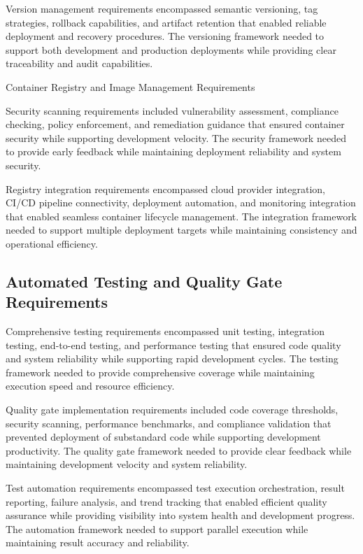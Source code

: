 Version management requirements encompassed semantic versioning, tag strategies, rollback capabilities, and artifact retention that enabled reliable deployment and recovery procedures. The versioning framework needed to support both development and production deployments while providing clear traceability and audit capabilities.

\begin{table}[H]
\centering
\caption{Container Registry and Image Management Requirements}
\label{tab:container-registry-management}
\end{table}

Security scanning requirements included vulnerability assessment, compliance checking, policy enforcement, and remediation guidance that ensured container security while supporting development velocity. The security framework needed to provide early feedback while maintaining deployment reliability and system security.

Registry integration requirements encompassed cloud provider integration, CI/CD pipeline connectivity, deployment automation, and monitoring integration that enabled seamless container lifecycle management. The integration framework needed to support multiple deployment targets while maintaining consistency and operational efficiency.

\subsection{Automated Testing and Quality Gate Requirements}

Comprehensive testing requirements encompassed unit testing, integration testing, end-to-end testing, and performance testing that ensured code quality and system reliability while supporting rapid development cycles. The testing framework needed to provide comprehensive coverage while maintaining execution speed and resource efficiency.

Quality gate implementation requirements included code coverage thresholds, security scanning, performance benchmarks, and compliance validation that prevented deployment of substandard code while supporting development productivity. The quality gate framework needed to provide clear feedback while maintaining development velocity and system reliability.

Test automation requirements encompassed test execution orchestration, result reporting, failure analysis, and trend tracking that enabled efficient quality assurance while providing visibility into system health and development progress. The automation framework needed to support parallel execution while maintaining result accuracy and reliability.

